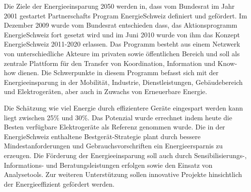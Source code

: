 Die Ziele der Energieeinsparung 2050 werden in, dass vom Bundesrat im Jahr 2001 gestartet Partnerschafts Program EnergieSchweiz definiert und gefördert. Im Dezember 2009 wurde vom Bundesrat entschieden dass, das Aktionsprogramm EnergieSchweiz fort gesetzt wird und im Juni 2010 wurde von ihm das Konzept EnergieSchweiz 2011-2020 erlassen. Das Programm besteht aus einem Netzwerk von unterschiedliche Akteure im privaten sowie öffentlichen Bereich und soll als zentrale Plattform für den Transfer von Koordination, Information und Know-how dienen. Die Schwerpunkte in diesem Programm befasst sich mit der Energieeinsparung in der Mobilität, Industrie, Dienstleistungen, Gebäudebereich und Elektrogeräten, aber auch in Zuwachs von Erneuerbare Energie. 
\par
Die Schätzung wie viel Energie durch effizientere Geräte eingespart werden kann liegt zwischen 25\% und 30\%. Das Potenzial wurde errechnet indem heute die Besten verfügbare Elektrogeräte als Referenz genommen wurde. Die in der EnergieSchweiz enthaltene Bestgerät-Strategie plant durch bessere Mindestanforderungen und Gebrauchsvorschriften ein Energieersparnis zu erzeugen. Die Förderung der Energieeinsparung soll auch durch Sensibilisierungs-, Informations- und Beratungsleistungen erfolgen sowie den Einsatz von Analysetools. Zur weiteren Unterstützung sollen innovative Projekte hinsichtlich der Energieeffizient gefördert werden.






